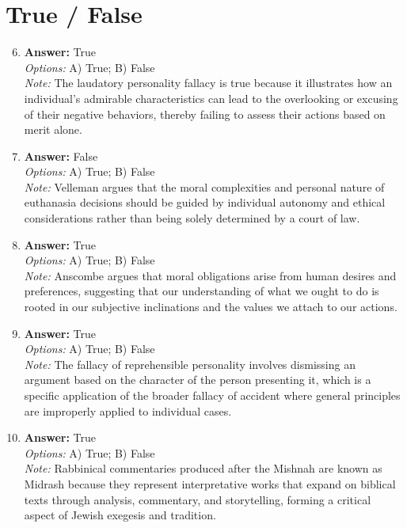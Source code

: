 \documentclass[12pt]{article}
\begin{document}
\section*{True / False}
\begin{enumerate}[label=\arabic*.]
\setcounter{enumi}{5}
\item \textbf{Answer:} True
\\ \textit{Options:} A) True; B) False
\\ \textit{Note:} The laudatory personality fallacy is true because it illustrates how an individual's admirable characteristics can lead to the overlooking or excusing of their negative behaviors, thereby failing to assess their actions based on merit alone.
\item \textbf{Answer:} False
\\ \textit{Options:} A) True; B) False
\\ \textit{Note:} Velleman argues that the moral complexities and personal nature of euthanasia decisions should be guided by individual autonomy and ethical considerations rather than being solely determined by a court of law.
\item \textbf{Answer:} True
\\ \textit{Options:} A) True; B) False
\\ \textit{Note:} Anscombe argues that moral obligations arise from human desires and preferences, suggesting that our understanding of what we ought to do is rooted in our subjective inclinations and the values we attach to our actions.
\item \textbf{Answer:} True
\\ \textit{Options:} A) True; B) False
\\ \textit{Note:} The fallacy of reprehensible personality involves dismissing an argument based on the character of the person presenting it, which is a specific application of the broader fallacy of accident where general principles are improperly applied to individual cases.
\item \textbf{Answer:} True
\\ \textit{Options:} A) True; B) False
\\ \textit{Note:} Rabbinical commentaries produced after the Mishnah are known as Midrash because they represent interpretative works that expand on biblical texts through analysis, commentary, and storytelling, forming a critical aspect of Jewish exegesis and tradition.
\end{enumerate}
\end{document}

